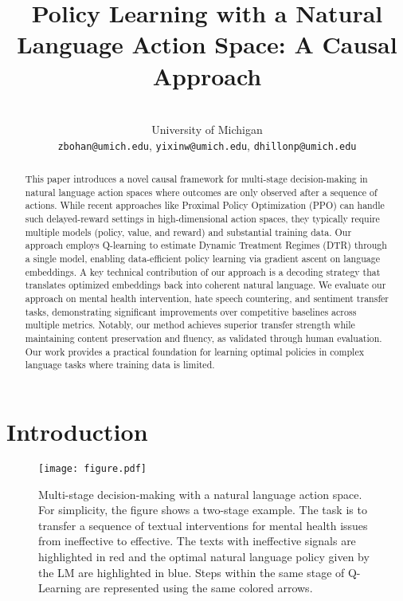 \documentclass{article}
\title{Policy Learning with a Natural Language Action Space: A Causal Approach}
\author{
    \makebox[\textwidth][c]{Bohan Zhang, Yixin Wang, Paramveer S. Dhillon}\\
    University of Michigan \\
    \texttt{zbohan@umich.edu}, \texttt{yixinw@umich.edu}, \texttt{dhillonp@umich.edu}
}
\date{}
\begin{document}
\maketitle

\begin{abstract}
This paper introduces a novel causal framework for multi-stage decision-making in natural language action spaces where outcomes are only observed after a sequence of actions. While recent approaches like Proximal Policy Optimization (PPO) can handle such delayed-reward settings in high-dimensional action spaces, they typically require multiple models (policy, value, and reward) and substantial training data. Our approach employs Q-learning to estimate Dynamic Treatment Regimes (DTR) through a single model, enabling data-efficient policy learning via gradient ascent on language embeddings. A key technical contribution of our approach is a decoding strategy that translates optimized embeddings back into coherent natural language. We evaluate our approach on mental health intervention, hate speech countering, and sentiment transfer tasks, demonstrating significant improvements over competitive baselines across multiple metrics. Notably, our method achieves superior transfer strength while maintaining content preservation and fluency, as validated through human evaluation. Our work provides a practical foundation for learning optimal policies in complex language tasks where training data is limited.
\end{abstract}

\section{Introduction}
\begin{figure*}[h]
\begin{small}
    \centering
    \texttt{[image: figure.pdf]}
    \caption{\small{Multi-stage decision-making with a natural language action space. For simplicity, the figure shows a two-stage example. The task is to transfer a sequence of textual interventions for mental health issues from ineffective to effective. The texts with ineffective signals are highlighted in red and the optimal natural language policy given by the LM are highlighted in blue. Steps within the same stage of Q-Learning are represented using the same colored arrows.}}
    \label{fig:gen-Q}
    \end{small}
\end{figure*}
\end{document}
